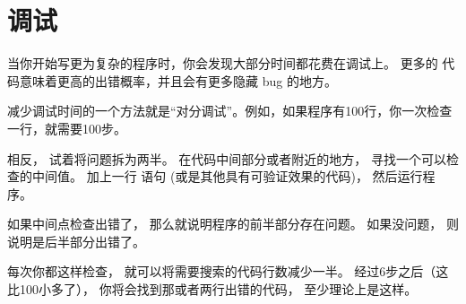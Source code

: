 \section{调试}
\label{bisectbug}


当你开始写更为复杂的程序时，你会发现大部分时间都花费在调试上。 更多的
代码意味着更高的出错概率，并且会有更多隐藏 bug 的地方。
  


减少调试时间的一个方法就是“对分调试”。例如，如果程序有100行，你一次检查一行，就需要100步。


相反， 试着将问题拆为两半。 在代码中间部分或者附近的地方， 寻找一个可以检查的中间值。 加上一行  语句 (或是其他具有可验证效果的代码)， 然后运行程序。


如果中间点检查出错了， 那么就说明程序的前半部分存在问题。 如果没问题， 则说明是后半部分出错了。


每次你都这样检查， 就可以将需要搜索的代码行数减少一半。 经过6步之后（这比100小多了）， 你将会找到那或者两行出错的代码， 至少理论上是这样。



